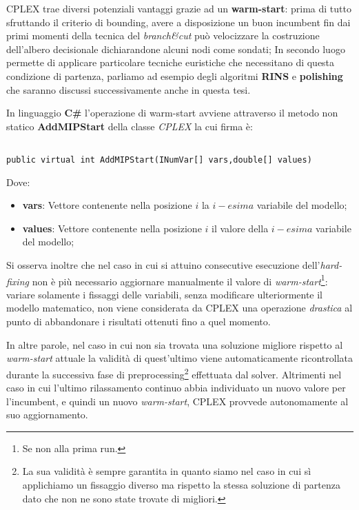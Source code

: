 \documentclass[11pt]{article}
\begin{document}
CPLEX trae diversi potenziali vantaggi grazie ad un \textbf{warm-start}: prima di tutto sfruttando il criterio di bounding, avere a disposizione un buon incumbent fin dai primi momenti della tecnica del \textit{branch\&cut} può velocizzare la costruzione dell'albero decisionale dichiarandone alcuni nodi come sondati; In secondo luogo permette di applicare particolare tecniche euristiche che necessitano di questa condizione di partenza, parliamo ad esempio degli algoritmi \textbf{RINS} e \textbf{polishing} che saranno discussi successivamente anche in questa tesi.

In linguaggio \textbf{C\#} l'operazione di warm-start avviene attraverso il metodo non statico \textbf{AddMIPStart} della classe \textit{CPLEX} la cui firma è:

\begin{lstlisting}

public virtual int AddMIPStart(INumVar[] vars,double[] values)

\end{lstlisting}

Dove:

\begin{itemize}
    \item \textbf{vars}: Vettore contenente nella posizione $i$ la $i-esima$ variabile del modello;
    \item \textbf{values}: Vettore contenente nella posizione $i$ il valore della $i-esima$ variabile del modello;
\end{itemize}

Si osserva inoltre che nel caso in cui si attuino consecutive esecuzione dell'\textit{hard-fixing} non è più necessario aggiornare manualmente il valore di \textit{warm-start}\footnote{Se non alla prima run.}: variare solamente i fissaggi delle variabili, senza modificare ulteriormente il modello matematico, non viene considerata da CPLEX una operazione \textit{drastica} al punto di abbandonare i risultati ottenuti fino a quel momento.

In altre parole, nel caso in cui non sia trovata una soluzione migliore rispetto al \textit{warm-start} attuale la validità di quest'ultimo viene automaticamente ricontrollata durante la successiva fase di preprocessing\footnote{La sua validità è sempre garantita in quanto siamo nel caso in cui sì applichiamo un fissaggio diverso ma rispetto la stessa soluzione di partenza dato che non ne sono state trovate di migliori.} effettuata dal solver. Altrimenti nel caso in cui l'ultimo rilassamento continuo abbia individuato un nuovo valore per l'incumbent, e quindi un nuovo \textit{warm-start}, CPLEX provvede autonomamente al suo aggiornamento.
\end{document}
